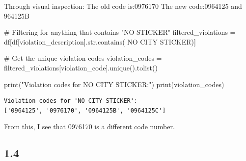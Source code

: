 \documentclass[
  letterpaper,
  DIV=11,
  numbers=noendperiod]{scrartcl}
\newenvironment{Shaded}{\begin{snugshade}}{\end{snugshade}}
\newcommand{\BuiltInTok}[1]{\textcolor[rgb]{0.00,0.23,0.31}{#1}}
\newcommand{\CommentTok}[1]{\textcolor[rgb]{0.37,0.37,0.37}{#1}}
\newcommand{\NormalTok}[1]{\textcolor[rgb]{0.00,0.23,0.31}{#1}}
\newcommand{\OperatorTok}[1]{\textcolor[rgb]{0.37,0.37,0.37}{#1}}
\newcommand{\StringTok}[1]{\textcolor[rgb]{0.13,0.47,0.30}{#1}}
\begin{document}
Through visual inspection: The old code is:0976170 The new code:0964125
and 964125B

\begin{Shaded}
\begin{Highlighting}[]
\CommentTok{\# Filtering for anything that contains "NO STICKER"}
\NormalTok{filtered\_violations }\OperatorTok{=}\NormalTok{ df[df[}\StringTok{\textquotesingle{}violation\_description\textquotesingle{}}\NormalTok{].}\BuiltInTok{str}\NormalTok{.contains(}
    \StringTok{\textquotesingle{}NO CITY STICKER\textquotesingle{}}\NormalTok{)]}

\CommentTok{\# Get the unique violation codes}
\NormalTok{violation\_codes }\OperatorTok{=}\NormalTok{ filtered\_violations[}\StringTok{\textquotesingle{}violation\_code\textquotesingle{}}\NormalTok{].unique().tolist()}

\BuiltInTok{print}\NormalTok{(}\StringTok{"Violation codes for \textquotesingle{}NO CITY STICKER\textquotesingle{}:"}\NormalTok{)}
\BuiltInTok{print}\NormalTok{(violation\_codes)}
\end{Highlighting}
\end{Shaded}

\begin{verbatim}
Violation codes for 'NO CITY STICKER':
['0964125', '0976170', '0964125B', '0964125C']
\end{verbatim}

From this, I see that 0976170 is a different code number.

\subsection{1.4}\label{section-3}
\end{document}
